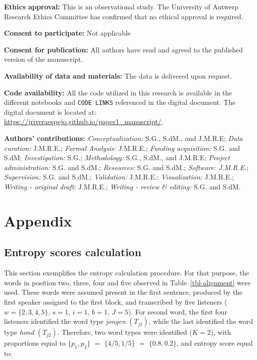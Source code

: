 \documentclass[
  authoryear,
  preprint,
  1p]{elsarticle}
\begin{document}
\textbf{Ethics approval:} This is an observational study. The University
of Antwerp Research Ethics Committee has confirmed that no ethical
approval is required.

\textbf{Consent to participate:} Not applicable

\textbf{Consent for publication:} All authors have read and agreed to
the published version of the manuscript.

\textbf{Availability of data and materials:} {The data is delivered upon
request.}

\textbf{Code availability:} {All the code utilized in this research is
available in the different notebooks and \texttt{CODE\ LINKS} referenced
in the digital document. The digital document is located at:}
\url{https://jriveraespejo.github.io/paper1_manuscript/}.

\textbf{Authors' contributions:} \emph{Conceptualization:} S.G., S.dM.,
and J.M.R.E; \emph{Data curation:} J.M.R.E.; \emph{Formal Analysis:}
J.M.R.E.; \emph{Funding acquisition:} S.G. and S.dM;
\emph{Investigation:} S.G.; \emph{Methodology:} S.G., S.dM., and
J.M.R.E; \emph{Project administration:} S.G. and S.dM.;
\emph{Resources:} S.G. and S.dM.; \emph{Software: J.M.R.E.};
\emph{Supervision:} S.G. and S.dM.; \emph{Validation:} J.M.R.E.;
\emph{Visualization:} J.M.R.E.; \emph{Writing - original draft:}
J.M.R.E.; \emph{Writing - review \& editing:} S.G. and S.dM.

\newpage{}

\section{Appendix}\label{sec-appendix}

\subsection{Entropy scores calculation}\label{sec-appA}

This section exemplifies the entropy calculation procedure. {For that
purpose, the words in position two, three, four and five observed in
Table~\ref{tbl-alignment} were used. These words were assumed present in
the first sentence, produced by the first speaker assigned to the first
block, and transcribed by five listeners (\(w=\{2,3,4,5\}\), \(s=1\),
\(i=1\), \(b=1\), \(J=5\)). For second word, the first four listeners
identified the word type \emph{jongen} \((T_{j1})\), while the last
identified the word type \emph{hond} \((T_{j2})\). Therefore, two word
types were identified (\(K=2\)), with proportions equal to
\(\{ p_{1}, p_{2} \}\) \(=\) \(\{ 4/5, 1/5 \}\) \(=\)
\(\{ 0.8, 0.2 \}\), and entropy score equal to:}
\end{document}
